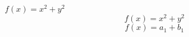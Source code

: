 \documentclass[12pt]{article}
\begin{document}
$f(x)=x^2+y^2 $
$$ f(x)=x^2+y^2 $$
\[
f(x)=a_1+b_1
\]
\end{document}
